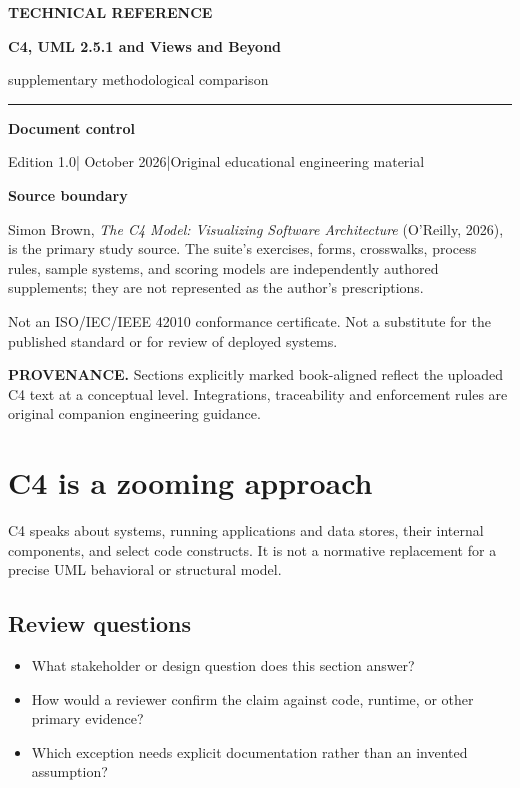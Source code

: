 \documentclass[10pt,letterpaper]{article}
\newcommand{\SourceNote}[1]{\par\smallskip\noindent\colorbox{C4Light}{\parbox{0.94\linewidth}{\footnotesize\textbf{PROVENANCE.} #1}}\par\medskip}
\newcommand{\DocStart}[3]{%
\begin{document}
\begin{titlepage}
\renewcommand{\thepage}{title-\arabic{page}}
\vspace*{0.55in}
{\sffamily\bfseries\small\color{C4Teal}#1}\par\vspace{0.24in}
{\sffamily\bfseries\fontsize{26}{31}\selectfont\color{C4Navy}#2}\par\vspace{0.18in}
{\large\color{C4Gray}#3}\par\vspace{0.4in}
\textcolor{C4Teal}{\rule{\linewidth}{1.15pt}}\par\vspace{0.24in}
\textbf{Document control}\par
Edition 1.0\quad|\quad 30 October 2026\quad|\quad Original educational engineering material\par
\vspace{0.17in}
\textbf{Source boundary}\par
Simon Brown, \emph{The C4 Model: Visualizing Software Architecture} (O'Reilly, 2026), is the primary study source. The suite's exercises, forms, crosswalks, process rules, sample systems, and scoring models are independently authored supplements; they are not represented as the author's prescriptions.\par
\vfill
{\small\color{C4Gray}Not an ISO/IEC/IEEE 42010 conformance certificate. Not a substitute for the published standard or for review of deployed systems.}\par
\end{titlepage}
}
\DocStart{TECHNICAL REFERENCE}{C4, UML 2.5.1 and Views and Beyond}{supplementary methodological comparison}
\tableofcontents\clearpage
\SourceNote{Sections explicitly marked book-aligned reflect the uploaded C4 text at a conceptual level. Integrations, traceability and enforcement rules are original companion engineering guidance.}
\section{C4 is a zooming approach}
C4 speaks about systems, running applications and data stores, their internal components, and select code constructs. It is not a normative replacement for a precise UML behavioral or structural model.


\subsection{Review questions}
\begin{itemize}
\item What stakeholder or design question does this section answer?
\item How would a reviewer confirm the claim against code, runtime, or other primary evidence?
\item Which exception needs explicit documentation rather than an invented assumption?
\end{itemize}
\end{document}
